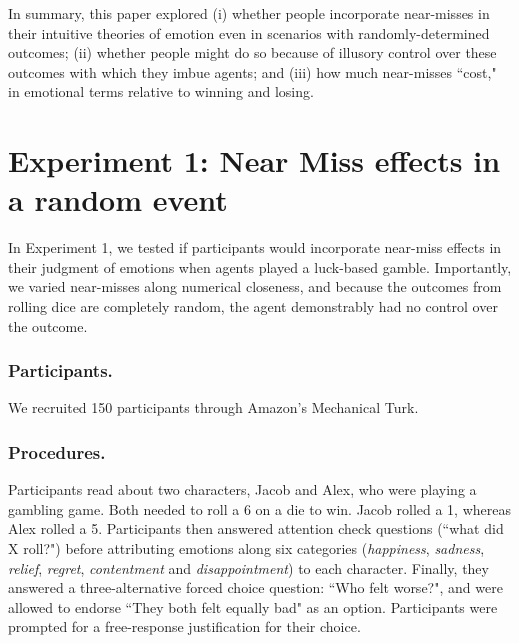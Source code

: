 \documentclass[10pt,letterpaper]{article}
\newcommand{\red}[1]{\textcolor{Red}{#1}}
\begin{document}
	In summary, this paper explored (i) whether people incorporate near-misses in their intuitive theories of emotion even in scenarios with randomly-determined outcomes; (ii) whether people might do so because of illusory control over these outcomes with which they imbue agents; and (iii) how much near-misses ``cost," in emotional terms relative to winning and losing.












\section{Experiment 1: Near Miss effects in a random event}

	In Experiment 1, we tested if participants would incorporate near-miss effects in their judgment of emotions when agents played a luck-based gamble. Importantly, we varied near-misses along numerical closeness, and because the outcomes from rolling dice are completely random, the agent demonstrably had no control over the outcome.

\subsubsection{Participants.} We recruited 150 participants through Amazon's Mechanical Turk.

\subsubsection{Procedures.} Participants read about two characters, Jacob and Alex, who were playing a gambling game. Both needed to roll a 6 on a die to win. Jacob rolled a 1, whereas Alex rolled a 5. Participants then answered attention check questions (``what did X roll?") before attributing emotions along six categories (\textit{happiness}, \textit{sadness}, \textit{relief}, \textit{regret}, \textit{contentment} and \textit{disappointment})  to each character. Finally, they answered a three-alternative forced choice question: ``Who felt worse?", and were allowed to endorse ``They both felt equally bad" as an option. Participants were prompted for a free-response justification for their choice.
\end{document}
